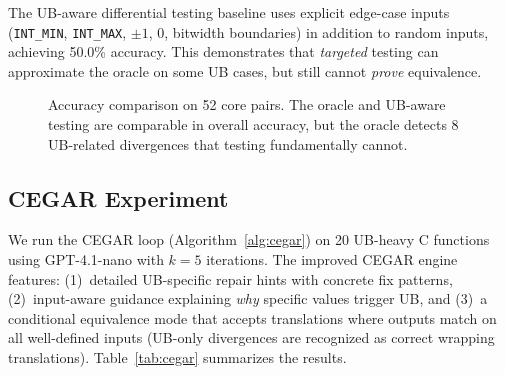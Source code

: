 \documentclass[11pt]{article}
\begin{document}
The UB-aware differential testing baseline uses explicit edge-case inputs
(\texttt{INT\_MIN}, \texttt{INT\_MAX}, $\pm 1$, $0$, bitwidth boundaries)
in addition to random inputs, achieving 50.0\% accuracy.  This demonstrates
that \emph{targeted} testing can approximate the oracle on some UB cases,
but still cannot \emph{prove} equivalence.

\begin{figure}[t]
\centering
{}
\caption{Accuracy comparison on 52 core pairs.  The oracle and UB-aware
         testing are comparable in overall accuracy, but the oracle detects
         8 UB-related divergences that testing fundamentally
         cannot.}\label{fig:difftest-bar}
\end{figure}

\subsection{CEGAR Experiment}\label{sec:eval:cegar}

We run the CEGAR loop (Algorithm~\ref{alg:cegar}) on 20 UB-heavy C functions
using GPT-4.1-nano with $k = 5$ iterations.  The improved CEGAR engine
features: (1)~detailed UB-specific repair hints with concrete fix patterns,
(2)~input-aware guidance explaining \emph{why} specific values trigger UB,
and (3)~a conditional equivalence mode that accepts translations where
outputs match on all well-defined inputs (UB-only divergences are recognized
as correct wrapping translations).  Table~\ref{tab:cegar} summarizes the
results.
\end{document}
